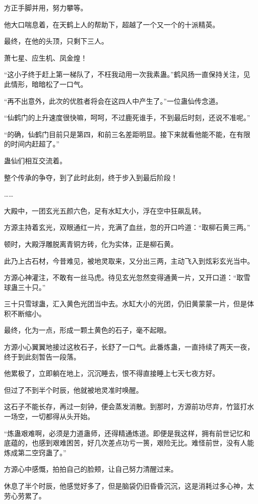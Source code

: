 \begin{this_body}
方正手脚并用，努力攀等。

他大口喘息着，在天鹤上人的帮助下，超越了一个又一个的十派精英。

最终，在他的头顶，只剩下三人。

萧七星、应生机、凤金煌！

“这小子终于赶上第一梯队了，不枉我动用一次我素蛊。”鹤风扬一直保持关注，见此情形，暗暗松了一口气。

“再不出意外，此次的优胜者将会在这四人中产生了。”一位蛊仙传念道。

“仙鹤门的上升速度很快嘛，呵呵，不过鹿死谁手，不到最后时刻，还说不准呢。”

“的确，仙鹤门目前只是第四，和前三名差距明显。接下来就看他能不能，在有限的时间内赶超了。”

蛊仙们相互交流着。

整个传承的争夺，到了此时此刻，终于步入到最后阶段！

……

大殿中，一团玄光五颜六色，足有水缸大小，浮在空中狂飙乱转。

方源主持着玄光，双眼通红一片，充满了血丝，忽的开口吟道：“取柳石黄三两。”

顿时，大殿浮雕脱离青铜方砖，化为实体，正是柳石黄。

此乃上古石材，今昔难见，被地灵取来，又分出三两，主动飞入到炫彩玄光当中。

方源心神灌注，不敢有一丝马虎。待见玄光忽然变得通黄一片，又开口道：“取雪球蛊三十只。”

三十只雪球蛊，汇入黄色光团当中去。水缸大小的光团，仍旧黄蒙蒙一片，但是体积不断缩小。

最终，化为一点，形成一颗土黄色的石子，毫不起眼。

方源小心翼翼地接过这枚石子，长舒了一口气。此番炼蛊，一直持续了两天一夜，终于到此刻暂告一段落。

他累极了，立即躺在地上，沉沉睡去，恨不得直接睡上七天七夜方好。

但过了不到半个时辰，他就被地灵准时唤醒。

这石子不能长存，再过一刻钟，便会蒸发消散。到那时，方源前功尽弃，竹篮打水一场空，一切都得从头开始。

“炼蛊艰难啊，必须是力道蛊师，还得精通炼道。即便是我这样，拥有前世记忆和底蕴的，也感到艰难困苦，好几次差点功亏一篑，艰险无比。难怪前世，没有人能炼成第二空窍蛊了。”

方源心中感慨，拍拍自己的脸颊，让自己努力清醒过来。

休息了半个时辰，他感觉好多了，但是脑袋仍旧昏昏沉沉，这是消耗过多心神，太劳心劳累了。


\end{this_body}
